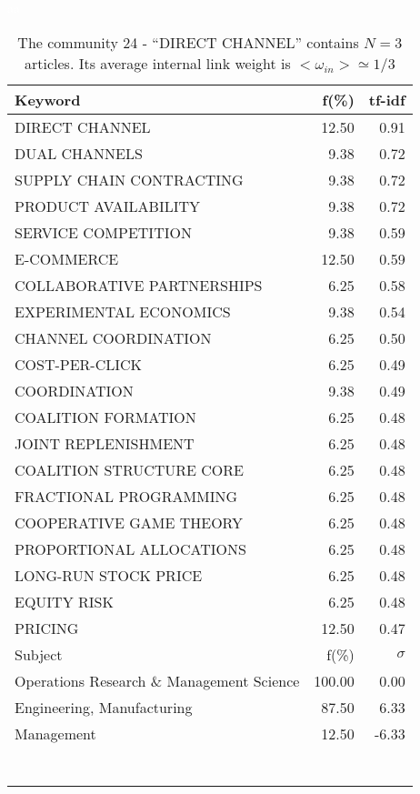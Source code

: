 \documentclass[a4paper,11pt]{report}
\begin{document}
\begin{landscape}
\begin{table}[!ht]
\caption{The community 24 - ``DIRECT CHANNEL'' contains $N = 3$ articles. Its average internal link weight is $<\omega_{in}> \simeq 1/3$ }
\textcolor{white}{aa}\\
{\scriptsize\begin{tabular}{|l r  r|}
\hline
Keyword & f(\%) & tf-idf \\
\hline
DIRECT CHANNEL & 12.50 & 0.91\\
DUAL CHANNELS & 9.38 & 0.72\\
SUPPLY CHAIN CONTRACTING & 9.38 & 0.72\\
PRODUCT AVAILABILITY & 9.38 & 0.72\\
SERVICE COMPETITION & 9.38 & 0.59\\
E-COMMERCE & 12.50 & 0.59\\
COLLABORATIVE PARTNERSHIPS & 6.25 & 0.58\\
EXPERIMENTAL ECONOMICS & 9.38 & 0.54\\
CHANNEL COORDINATION & 6.25 & 0.50\\
COST-PER-CLICK & 6.25 & 0.49\\
COORDINATION & 9.38 & 0.49\\
COALITION FORMATION & 6.25 & 0.48\\
JOINT REPLENISHMENT & 6.25 & 0.48\\
COALITION STRUCTURE CORE & 6.25 & 0.48\\
FRACTIONAL PROGRAMMING & 6.25 & 0.48\\
COOPERATIVE GAME THEORY & 6.25 & 0.48\\
PROPORTIONAL ALLOCATIONS & 6.25 & 0.48\\
LONG-RUN STOCK PRICE & 6.25 & 0.48\\
EQUITY RISK & 6.25 & 0.48\\
PRICING & 12.50 & 0.47\\
\hline
\hline
Subject & f(\%) & $\sigma$\\
\hline
Operations Research \& Management Science & 100.00 & 0.00\\
Engineering, Manufacturing & 87.50 & 6.33\\
Management & 12.50 & -6.33\\
 &  & \\
 &  & \\
 &  & \\
 &  & \\
 &  & \\
 &  & \\
 &  & \\

\end{tabular}}
\end{table}
\end{landscape}
\end{document}
